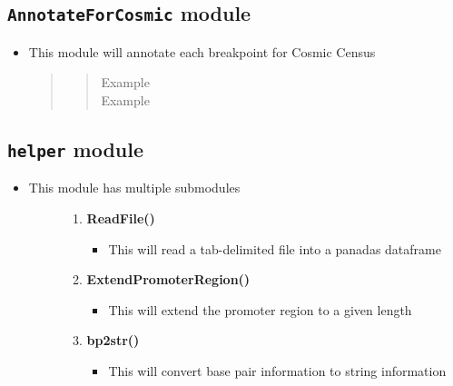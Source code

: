 \documentclass[letterpaper,10pt,english]{sphinxmanual}
\begin{document}
\subsection{\texttt{AnnotateForCosmic} module}
\label{iAnnotateSV:annotateforcosmic-module}\begin{itemize}
\item {} 
This module will annotate each breakpoint for Cosmic Census
\begin{quote}
\begin{quote}\begin{description}
\item[{Example}] \leavevmode
{}

\item[{Example}] \leavevmode
{}

\end{description}\end{quote}
\end{quote}

\end{itemize}


\subsection{\texttt{helper} module}
\label{iAnnotateSV:helper-module}\begin{itemize}
\item {} \begin{description}
\item[{This module has multiple submodules}] \leavevmode\begin{enumerate}
\item {} 
\textbf{ReadFile()}
\begin{itemize}
\item {} 
This will read a tab-delimited file into a panadas dataframe

\end{itemize}

\item {} 
\textbf{ExtendPromoterRegion()}
\begin{itemize}
\item {} 
This will extend the promoter region to a given length

\end{itemize}

\item {} 
\textbf{bp2str()}
\begin{itemize}
\item {} 
This will convert base pair information to string information

\end{itemize}

\end{enumerate}

\end{description}

\end{itemize}
\end{document}
